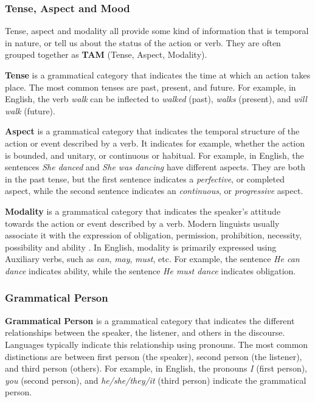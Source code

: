 \subsubsection{Tense, Aspect and Mood}

Tense, aspect and modality all provide some kind of information that is temporal in nature, or tell us about the status of the action or verb. 
They are often grouped together as \textbf{TAM} (Tense, Aspect, Modality). 

\textbf{Tense} is a grammatical category that indicates the time at which an action takes place. The most common tenses are past, present, and future. 
For example, in English, the verb \textit{walk} can be inflected to \textit{walked} (past), \textit{walks} (present), and \textit{will walk} (future).


\textbf{Aspect} is a grammatical category that indicates the temporal structure of the action or event described by a verb. It indicates for example, 
whether the action is bounded, and unitary, or continuous or habitual. For example, in English, the sentences \textit{She danced} and \textit{She was dancing}
have different aspects. They are both in the past tense, but the first sentence indicates a \textit{perfective}, or completed aspect, while 
the second sentence indicates an \textit{continuous}, or \textit{progressive} aspect.

\textbf{Modality} is a grammatical category that indicates the speaker's attitude towards the action or event described by a verb. Modern linguists 
usually associate it with the expression of obligation, permission, prohibition, necessity, possibility and ability \cite{trask2007language}. In English,
modality is primarily expressed using Auxiliary verbs, such as \textit{can}, \textit{may}, \textit{must}, etc. For example, the sentence \textit{He can dance} indicates ability, while
the sentence \textit{He must dance} indicates obligation.


\subsubsection{Grammatical Person}
\textbf{Grammatical Person} is a grammatical category that indicates the different relationships between the speaker, the listener, and others in the discourse.
Languages typically indicate this relationship using pronouns. The most common distinctions are between first person (the speaker), second person (the listener), and third person (others).
For example, in English, the pronouns \textit{I} (first person), \textit{you} (second person), and \textit{he/she/they/it} (third person) indicate the grammatical person.

